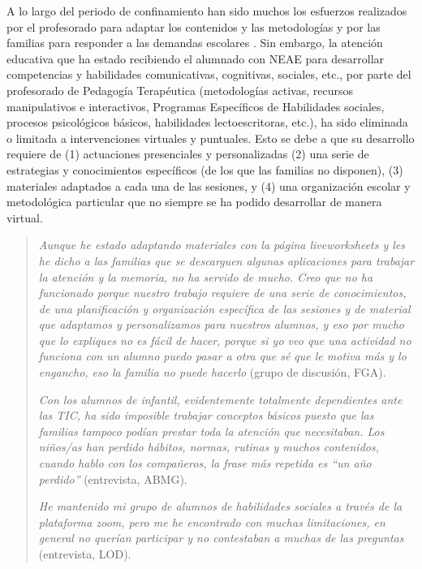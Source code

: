 \documentclass{textolivre}
\begin{document}
A lo largo del periodo de confinamiento han sido muchos los esfuerzos realizados por el profesorado para adaptar los contenidos y las metodologías y por las familias para responder a las demandas escolares \cite{rogero2020}. %
Sin embargo, la atención educativa que ha estado recibiendo el alumnado con NEAE para desarrollar competencias y habilidades comunicativas, cognitivas, sociales, etc., por parte del profesorado de Pedagogía Terapéutica (metodologías activas, recursos manipulativos e interactivos, Programas Específicos de Habilidades sociales, procesos psicológicos básicos, habilidades lectoescritoras, etc.), ha sido eliminada o limitada a intervenciones virtuales y puntuales. Esto se debe a que su desarrollo requiere de (1) actuaciones presenciales y personalizadas (2) una serie de estrategias y conocimientos específicos (de los que las familias no disponen), (3) materiales adaptados a cada una de las sesiones, y (4) una organización escolar y metodológica particular que no siempre se ha podido desarrollar de manera virtual.

\begin{quote}
\emph{Aunque he estado adaptando materiales con la página liveworksheets y les he dicho a las familias que se descarguen algunas aplicaciones para trabajar la atención y la memoria, no ha servido de mucho. Creo que no ha funcionado porque nuestro trabajo requiere de una serie de conocimientos, de una planificación y organización específica de las sesiones y de material que adaptamos y personalizamos para nuestros alumnos, y eso por mucho que lo expliques no es fácil de hacer, porque si yo veo que una actividad no funciona con un alumno puedo pasar a otra que sé que le motiva más y lo engancho, eso la familia no puede hacerlo} (grupo de discusión, FGA).

\emph{Con los alumnos de infantil, evidentemente totalmente dependientes ante las TIC, ha sido imposible trabajar conceptos básicos puesto que las familias tampoco podían prestar toda la atención que necesitaban. Los niños/as han perdido hábitos, normas, rutinas y muchos contenidos, cuando hablo con los compañeros, la frase más repetida es “un año perdido”} (entrevista, ABMG).

\emph{He mantenido mi grupo de alumnos de habilidades sociales a través de la plataforma zoom, pero me he encontrado con muchas limitaciones, en general no querían participar y no contestaban a muchas de las preguntas} (entrevista, LOD).
\end{quote}
\end{document}
